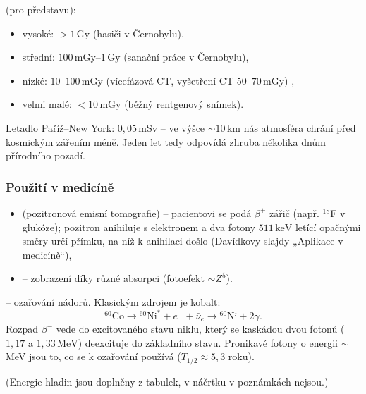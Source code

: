  (pro představu):
\begin{itemize}
  \item vysoké: \(> 1\,\text{Gy}\) (hasiči v Černobylu),
  \item střední: \(100\,\text{mGy}\)–\(1\,\text{Gy}\) (sanační práce v Černobylu),
  \item nízké: \(10\)–\(100\,\text{mGy}\) (vícefázová CT, vyšetření CT
  \(50\)–\(70\,\text{mGy}\)) ,
  \item velmi malé: \(< 10\,\text{mGy}\) (běžný rentgenový snímek).
\end{itemize}
Letadlo Paříž–New York: \(0{,}05\,\text{mSv}\) – ve výšce \(\sim 10\,\text{km}\)
nás atmosféra chrání před kosmickým zářením méně. Jeden let tedy odpovídá
zhruba několika dnům přírodního pozadí.

\subsubsection{Použití v medicíně}
\begin{itemize}
  \item {} (pozitronová emisní tomografie) – pacientovi se podá
  \(\beta^+\) zářič (např. \({}^{18}\)F v glukóze); pozitron anihiluje
  s elektronem a dva fotony \(511\,\text{keV}\) letící opačnými směry
  určí přímku, na níž k anihilaci došlo (Davídkovy slajdy „Aplikace
  v medicíně``),
  \item {} – zobrazení díky různé absorpci (fotoefekt \(\sim Z^5\)).
\end{itemize}

 – ozařování nádorů. Klasickým zdrojem je kobalt:
\[
  {}^{60}\text{Co} \to {}^{60}\text{Ni}^* + e^- + \bar\nu_e \to {}^{60}\text{Ni} + 2\gamma .
\]
Rozpad \(\beta^-\) vede do excitovaného stavu niklu, který se kaskádou
dvou fotonů (\(1{,}17\) a \(1{,}33\,\text{MeV}\)) deexcituje do základního
stavu. Pronikavé fotony o energii \(\sim\)\,MeV jsou to, co se k ozařování
používá (\(T_{1/2}\approx 5{,}3\) roku).

\begin{center}
\end{center}
(Energie hladin jsou doplněny z tabulek, v náčrtku v poznámkách nejsou.)

